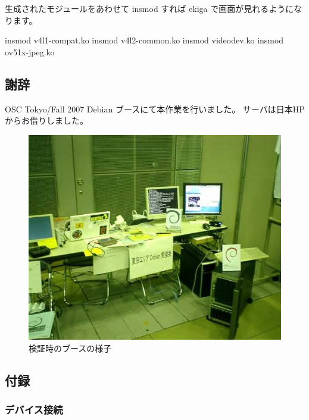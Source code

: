 \documentclass[mingoth,a4paper]{jsarticle}
\begin{document}
生成されたモジュールをあわせて insmod すれば ekiga で画面が見れるようになります。

\begin{commandline}
insmod v4l1-compat.ko
insmod v4l2-common.ko
insmod videodev.ko
insmod ov51x-jpeg.ko
\end{commandline}

\subsection{謝辞}

OSC Tokyo/Fall 2007 Debian ブースにて本作業を行いました。
サーバは日本HPからお借りしました。

\begin{figure}[H]
\begin{center}
  \includegraphics[width=0.5\hsize]{image200710/booth.jpg}
\end{center}
\caption{検証時のブースの様子}
\label{fig:oscfalldebbooth}
\end{figure}
\subsection{付録}

\subsubsection{デバイス接続}
\end{document}
